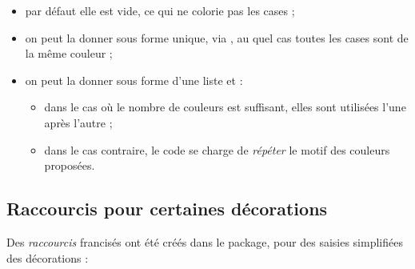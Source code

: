 \documentclass[11pt,a4paper]{ltxdoc}
\begin{document}
\begin{itemize}
	\item par défaut elle est vide, ce qui ne colorie pas les cases ;
	\item on peut la donner sous forme unique, via , au quel cas toutes les cases sont de la même couleur ;
	\item on peut la donner sous forme d'une liste  et :
	\begin{itemize}
		\item dans le cas où le nombre de couleurs est suffisant, elles sont utilisées l'une après l'autre ;
		\item dans le cas contraire, le code se charge de \textit{répéter} le motif des couleurs proposées.
	\end{itemize}
\end{itemize}

\subsection{Raccourcis pour certaines décorations}

Des \textit{raccourcis} francisés ont été créés dans le package, pour des saisies simplifiées des décorations :
\end{document}
